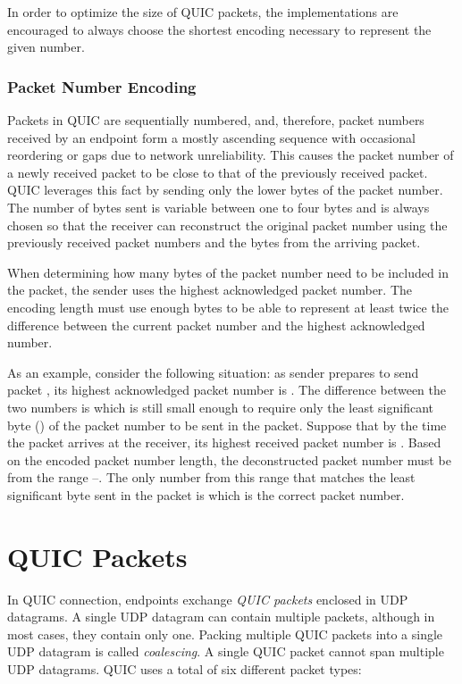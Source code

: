 In order to optimize the size of QUIC packets, the implementations are encouraged to always choose
the shortest encoding necessary to represent the given number.

\subsubsection{Packet Number Encoding}\label{sec:02-packet-number-encoding}

Packets in QUIC are sequentially numbered, and, therefore, packet numbers received by an endpoint
form a mostly ascending sequence with occasional reordering or gaps due to network unreliability.
This causes the packet number of a newly received packet to be close to that of the previously
received packet. QUIC leverages this fact by sending only the lower bytes of the packet number. The
number of bytes sent is variable between one to four bytes and is always chosen so that the receiver
can reconstruct the original packet number using the previously received packet numbers and the
bytes from the arriving packet.

When determining how many bytes of the packet number need to be included in the packet, the sender
uses the highest acknowledged packet number. The encoding length must use enough bytes to be able to
represent at least twice the difference between the current packet number and the highest
acknowledged number.

As an example, consider the following situation: as sender prepares to send packet ,
its highest acknowledged packet number is . The difference between the two numbers is
 which is still small enough to require only the least significant byte () of
the packet number to be sent in the packet. Suppose that by the time the packet arrives at the
receiver, its highest received packet number is . Based on the encoded packet number
length, the deconstructed packet number must be from the range --. The only
number from this range that matches the least significant byte sent in the packet is 
which is the correct packet number.

\section{QUIC Packets}

In QUIC connection, endpoints exchange \textit{QUIC packets} enclosed in UDP datagrams. A single UDP
datagram can contain multiple packets, although in most cases, they contain only one. Packing
multiple QUIC packets into a single UDP datagram is called \textit{coalescing}. A single QUIC packet
cannot span multiple UDP datagrams. QUIC uses a total of six different packet types:

